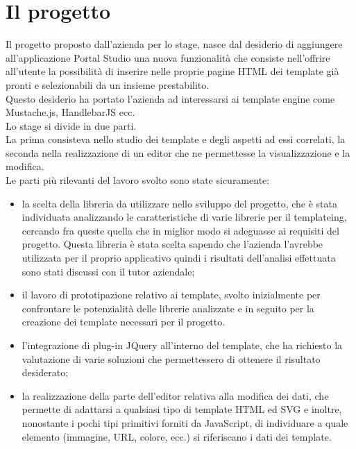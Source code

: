 \section{Il progetto}
Il progetto proposto dall'azienda per lo stage, nasce dal desiderio di aggiungere all'applicazione Portal Studio una nuova funzionalità che consiste nell'offrire all'utente la possibilità di inserire nelle proprie pagine HTML dei template già pronti e selezionabili da un insieme prestabilito.\\
Questo desiderio ha portato l'azienda ad interessarsi ai template engine come Mustache.js, HandlebarJS ecc.\\
Lo stage si divide in due parti.\\
La prima consisteva nello studio dei template e degli aspetti ad essi correlati, la seconda nella realizzazione di un editor che ne permettesse la visualizzazione e la modifica.\\
Le parti più rilevanti del lavoro svolto sono state sicuramente:
\begin{itemize}
	\item la scelta della libreria da utilizzare nello sviluppo del progetto, che è stata individuata analizzando le caratteristiche di varie librerie per il templateing, cercando fra queste quella che in miglior modo si adeguasse ai requisiti del progetto.
	Questa libreria è stata scelta sapendo che l'azienda l'avrebbe utilizzata per il proprio applicativo quindi i risultati dell'analisi effettuata sono stati discussi con il tutor aziendale;
	
	\item il lavoro di prototipazione relativo ai template, svolto inizialmente per confrontare le potenzialità delle librerie analizzate e in seguito per la creazione dei template necessari per il progetto.
	
	\item l'integrazione di plug-in JQuery all'interno del template, che ha richiesto la valutazione di varie soluzioni che permettessero di ottenere il risultato desiderato;
	
	\item la realizzazione della parte dell'editor relativa alla modifica dei dati, che permette di adattarsi a qualsiasi tipo di template HTML ed SVG e inoltre, nonostante i pochi tipi primitivi forniti da JavaScript, di individuare a quale elemento (immagine, URL, colore, ecc.) si riferiscano i dati dei template.
	  
\end{itemize}
